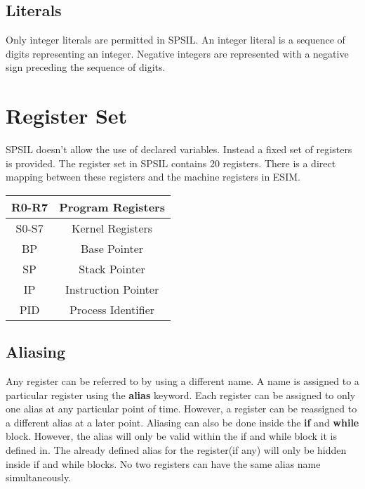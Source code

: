 \subsection{Literals}
Only integer literals are permitted in SPSIL. An integer literal is a sequence of digits representing an integer. Negative integers are represented with a negative sign preceding the sequence of digits.  



\section{Register Set}

SPSIL doesn't allow the use of declared variables. Instead a fixed set of registers is provided. The register set in SPSIL contains 20 registers. There is a direct mapping between these registers and the machine registers in ESIM.   \\

\begin{center}
\begin{tabular}{| c | c | }
\hline
R0-R7 & Program Registers \\
\hline
S0-S7 & Kernel Registers \\
\hline
BP 		& Base Pointer \\
\hline
SP		& Stack Pointer \\
\hline
IP		& Instruction Pointer \\
\hline
PID	& Process Identifier \\
\hline
\end{tabular}
\end{center}

\subsection{Aliasing}
Any register can be referred to by using a different name. A name is assigned to a particular register using the \textbf{alias} keyword. Each register can be assigned to only one alias at any particular point of time. However, a  register can be reassigned to a different alias at a later point. Aliasing can also be done inside the \textbf{if} and \textbf{while} block. However, the alias will only be valid within the if and while block it is defined in. The already defined alias for the register(if any) will only be hidden inside if and while blocks. No two registers can have the same alias name simultaneously.



